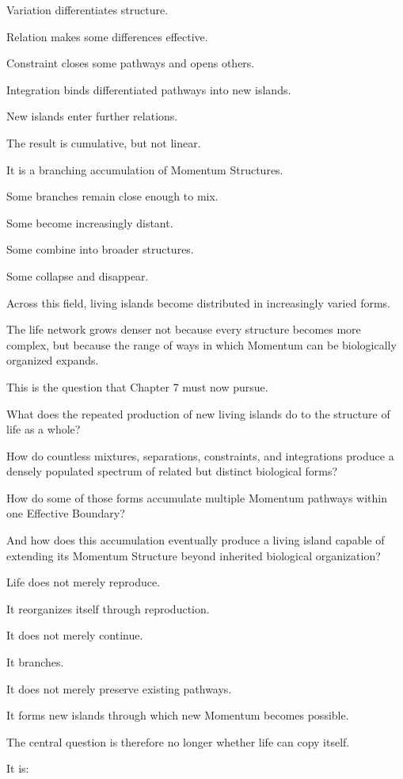 Variation differentiates structure.

Relation makes some differences effective.

Constraint closes some pathways and opens others.

Integration binds differentiated pathways into new islands.

New islands enter further relations.

The result is cumulative, but not linear.

It is a branching accumulation of Momentum Structures.

Some branches remain close enough to mix.

Some become increasingly distant.

Some combine into broader structures.

Some collapse and disappear.

Across this field, living islands become distributed in increasingly varied forms.

The life network grows denser not because every structure becomes more complex, but because the range of ways in which Momentum can be biologically organized expands.

This is the question that Chapter 7 must now pursue.

What does the repeated production of new living islands do to the structure of life as a whole?

How do countless mixtures, separations, constraints, and integrations produce a densely populated spectrum of related but distinct biological forms?

How do some of those forms accumulate multiple Momentum pathways within one Effective Boundary?

And how does this accumulation eventually produce a living island capable of extending its Momentum Structure beyond inherited biological organization?

Life does not merely reproduce.

It reorganizes itself through reproduction.

It does not merely continue.

It branches.

It does not merely preserve existing pathways.

It forms new islands through which new Momentum becomes possible.

The central question is therefore no longer whether life can copy itself.

It is:

